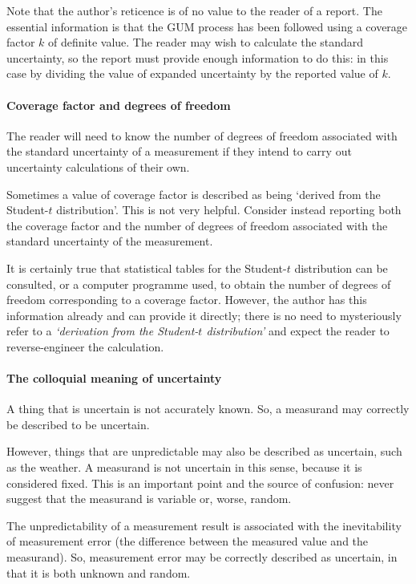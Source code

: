 Note that the author's reticence is of no value to the reader of a report. The essential information is that the GUM process has been followed using a coverage factor $k$ of definite value. The reader may wish to calculate the standard uncertainty, so the report must provide enough information to do this: in this case by dividing the value of expanded uncertainty by the reported value of $k$.

\paragraph{Coverage factor and degrees of freedom}
The reader will need to know the number of degrees of freedom associated with the standard uncertainty of a measurement if they intend to carry out uncertainty calculations of their own. 

Sometimes a value of coverage factor is described as being `derived from the Student-$t$ distribution'. This is not very helpful. Consider instead reporting both the coverage factor and the number of degrees of freedom associated with the standard uncertainty of the measurement.

It is certainly true that statistical tables for the Student-$t$ distribution can be consulted, or a computer programme used, to obtain the number of degrees of freedom corresponding to a coverage factor. However, the author has this information already and can provide it directly; there is no need to mysteriously refer to a \textit{`derivation from the Student-$t$ distribution'} and expect the reader to reverse-engineer the calculation. 

\paragraph{The colloquial meaning of uncertainty}
A thing that is uncertain is not accurately known. So, a measurand may correctly be described to be uncertain. 

However, things that are unpredictable may also be described as uncertain, such as the weather. A measurand is not uncertain in this sense, because it is considered fixed. This is an important point and the source of confusion: never suggest that the measurand is variable or, worse, random. 

The unpredictability of a measurement result is associated with the inevitability of measurement error (the difference between the measured value and the measurand). So, measurement error may be correctly described as uncertain, in that it is both unknown and random.

